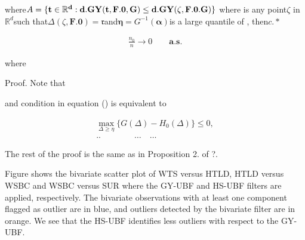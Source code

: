 \documentclass{article}
\begin{document}
where$A = \{ \bf t \in \mathbb { R } ^ { d } : d . { G Y } ( t, F . { 0 }, G ) \leq d . { G Y } ( \zeta, F . { 0 }. G ) \}$ where is any point$\zeta$
in$\mathbb { R } ^ { d }$such that$\Delta ( \zeta, \mathbf { F . { 0 } } ) = \mathfrak { r }$and${ \pmb \eta } = G ^ { - 1 } ( { \pmb \alpha } )$is a large quantile of , then$c . { * }$


\begin{equation}
\begin{array} { c } { \frac { n _ { 0 } } { n } \rightarrow 0 \qquad \mathbf { a. s. } } \end{array}
\end{equation}


where


Proof. Note that


and condition in equation () is equivalent to


\begin{equation}
\begin{array} { c } { \operatorname* { m a x } _ { \Delta \geq \eta } \{ G ( \Delta ) - H _ { 0 } ( \Delta ) \} \leq 0, } \\ {.. \qquad \qquad \dots \quad \dots } \end{array}
\end{equation}


The rest of the proof is the same as in Proposition 2. of ?.


Figure shows the bivariate scatter plot of WTS versus HTLD, HTLD
versus WSBC and WSBC versus SUR where the GY-UBF and HS-UBF
filters are applied, respectively. The bivariate observations with at least
one component flagged as outlier are in blue, and outliers detected by the
bivariate filter are in orange. We see that the HS-UBF identifies less outliers
with respect to the GY-UBF.
\end{document}
